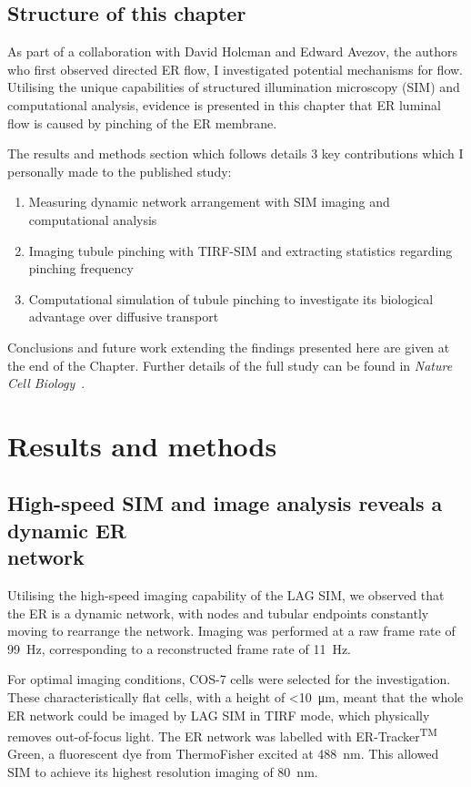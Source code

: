 \subsection{Structure of this chapter}
As part of a collaboration with David Holcman and Edward Avezov, the authors who first observed directed ER flow, I investigated potential mechanisms for flow. 
Utilising the unique capabilities of structured illumination microscopy (SIM) and computational analysis, evidence is presented in this chapter that ER luminal flow is caused by pinching of the ER membrane.

\newpage
The results and methods section which follows details 3 key contributions which I personally made to the published study:
\begin{enumerate}
	\item Measuring dynamic network arrangement with SIM imaging and computational analysis
	\item Imaging tubule pinching with TIRF-SIM and extracting statistics regarding pinching frequency
	\item Computational simulation of tubule pinching to investigate its biological advantage over diffusive transport
\end{enumerate}

Conclusions and future work extending the findings presented here are given at the end of the Chapter. 
Further details of the full study can be found in \textit{Nature Cell Biology}~\cite{holcman2018single}. 

\section{Results and methods} \label{sec:ERresults}
\subsection[High-speed SIM and image analysis reveals a dynamic ER network]{High-speed SIM and image analysis reveals a dynamic ER\\ network} \label{sec:ERnetwork}
Utilising the high-speed imaging capability of the LAG SIM, we  observed that the ER is a dynamic network, with nodes and tubular endpoints constantly moving to rearrange the network. 
Imaging was performed at a raw frame rate of \SI{99}{\hertz}, corresponding to a reconstructed frame rate of \SI{11}{\hertz}. 

For optimal imaging conditions, COS-7 cells were selected for the investigation. 
These characteristically flat cells, with a height of <\SI{10}{\micro\meter}, 
meant that the whole ER network could be imaged by LAG SIM in TIRF mode, which physically removes out-of-focus light. 
The ER network was labelled with ER-Tracker\textsuperscript{TM} Green, a fluorescent dye from ThermoFisher excited at \SI{488}{\nano\meter}. 
This allowed SIM to achieve its highest resolution imaging of \SI{80}{\nano\meter}. 

